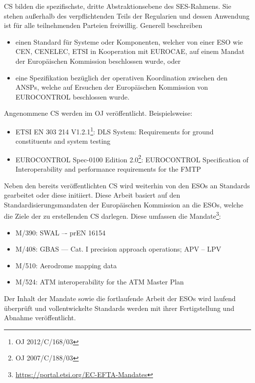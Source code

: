 

\acf{CS} bilden die spezifischste, dritte Abstraktionsebene des \ac{SES}-Rahmens.
Sie stehen außerhalb des verpflichtenden Teils der Regularien und dessen Anwendung ist für alle teilnehmenden Parteien freiwillig. 
Generell beschreiben 
    
    \begin{itemize}
        \item einen Standard für Systeme oder Komponenten, welcher von einer \ac{ESO} wie \ac{CEN}, \ac{CENELEC}, \ac{ETSI} in Kooperation mit \ac{EUROCAE}, auf einem Mandat der Europäischen Kommission beschlossen wurde, oder
        \item eine Spezifikation bezüglich der operativen Koordination zwischen den \acp{ANSP}, welche auf Ersuchen der Europäischen Kommission von EUROCONTROL beschlossen wurde.
    \end{itemize}

\noindent
Angenommene \ac{CS} werden im \ac{OJ} veröffentlicht.
Beispielsweise:

\begin{itemize}
    \item \ac{ETSI} EN 303 214 V1.2.1\footnote{\ac{OJ} 2012/C/168/03}: 
        \acf{DLS} System: Requirements for ground constituents and system testing
    \item EUROCONTROL Spec-0100 Edition 2.0\footnote{\ac{OJ} 2007/C/188/03}:
        EUROCONTROL Specification of Interoperability and performance requirements for the \acf{FMTP}
\end{itemize}

\noindent
Neben den bereits veröffentlichten \ac{CS} wird weiterhin von den \acp{ESO} an Standards gearbeitet oder diese initiiert. 
Diese Arbeit basiert auf den Standardisierungsmandaten der Europäischen Kommission an die \acp{ESO}, welche die Ziele der zu erstellenden \ac{CS} darlegen.
Diese umfassen die Mandate\footnote{\href{https://portal.etsi.org/EC-EFTA-Mandates}{https://portal.etsi.org/EC-EFTA-Mandates}}:
\begin{itemize}
    \item M/390: \acf{SWAL} –- prEN 16154
    \item M/408: \acf{GBAS} --- Cat. I precision approach operations; \ac{APV} – \ac{LPV}
    \item M/510: Aerodrome mapping data
    \item M/524: \acf{ATM} interoperability for the ATM Master Plan
\end{itemize}

Der Inhalt der Mandate sowie die fortlaufende Arbeit der ESOs wird laufend überprüft und vollentwickelte Standards werden mit ihrer Fertigstellung und Abnahme veröffentlicht.
